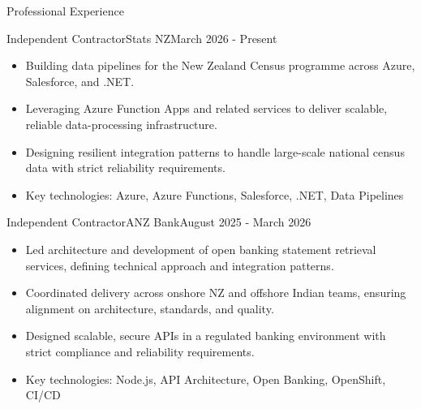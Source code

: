 \documentclass{mcdowellcv}
\begin{document}
\begin{cvsection}{Professional Experience}
    \begin{cvsubsection}{Independent Contractor}{Stats NZ}{March 2026 - Present}
        \begin{itemize}
            \item Building data pipelines for the New Zealand Census programme across Azure, Salesforce, and .NET.
            \item Leveraging Azure Function Apps and related services to deliver scalable, reliable data-processing infrastructure.
            \item Designing resilient integration patterns to handle large-scale national census data with strict reliability requirements.
            \item Key technologies: Azure, Azure Functions, Salesforce, .NET, Data Pipelines
        \end{itemize}
    \end{cvsubsection}

    \begin{cvsubsection}{Independent Contractor}{ANZ Bank}{August 2025 - March 2026}
        \begin{itemize}
            \item Led architecture and development of open banking statement retrieval services, defining technical approach and integration patterns.
            \item Coordinated delivery across onshore NZ and offshore Indian teams, ensuring alignment on architecture, standards, and quality.
            \item Designed scalable, secure APIs in a regulated banking environment with strict compliance and reliability requirements.
            \item Key technologies: Node.js, API Architecture, Open Banking, OpenShift, CI/CD
        \end{itemize}
    \end{cvsubsection}


\end{cvsection}
\end{document}
